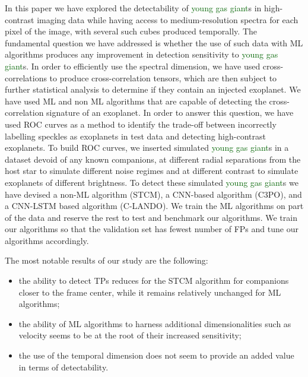 \documentclass[referee]{aa} %
\newcommand{\newchange}[1]{\textcolor{darkgreen}{#1}}
\begin{document}
In this paper we have explored the detectability of \newchange{young gas giant}s in high-contrast imaging data while having access to medium-resolution spectra for each pixel of the image, with several such cubes produced temporally.
The fundamental question we have addressed is whether the use of such data with ML algorithms produces any improvement in detection sensitivity to \newchange{young gas giant}s.
In order to efficiently use the spectral dimension, we have used cross-correlations to produce cross-correlation tensors, which are then subject to further statistical analysis to determine if they contain an injected exoplanet.
We have used ML and non ML algorithms that are capable of detecting the cross-correlation signature of an exoplanet. %
In order to answer this question, we have used ROC curves as a method to identify the trade-off between incorrectly labelling speckles as exoplanets in test data and detecting high-contrast exoplanets.
To build ROC curves, we inserted simulated \newchange{young gas giant}s in a dataset devoid of any known companions, at different radial separations from the host star to simulate different noise regimes and at different contrast to simulate exoplanets of different brightness.
To detect these simulated \newchange{young gas giant}s we have devised a non-ML algorithm (STCM), a CNN-based algorithm (C3PO), and a CNN-LSTM based algorithm (C-LANDO). 
We train the ML algorithms on part of the data and reserve the rest to test and benchmark our algorithms. 
We train our algorithms so that the validation set has fewest number of FPs and tune our algorithms accordingly. 

The most notable results of our study are the following:
\begin{itemize}
    \item the ability to detect TPs reduces for the STCM algorithm for companions closer to the frame center, while it remains relatively unchanged for ML algorithms;
    \item the ability of ML algorithms to harness additional dimensionalities such as velocity seems to be at the root of their increased sensitivity;
    \item the use of the temporal dimension does not seem to provide an added value in terms of detectability.%
\end{itemize}
\end{document}
